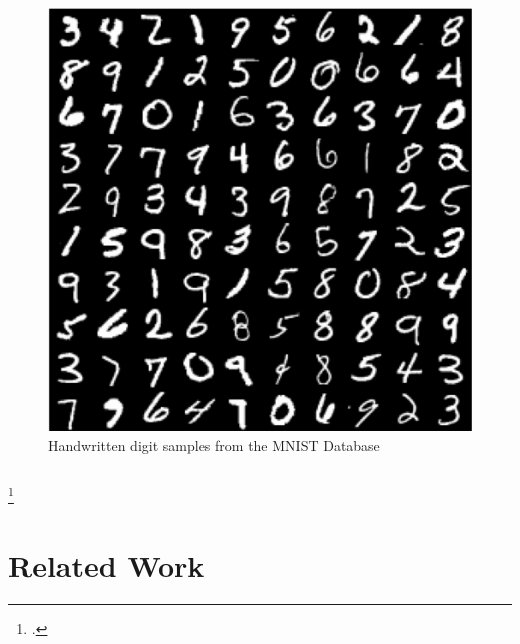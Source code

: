 \documentclass[aspectratio=169,usenames,dvipsnames]{beamer}
\begin{document}
\begin{frame}
\begin{columns}[c]
\begin{column}{.5\linewidth}
\begin{figure}
\centering
\includegraphics[width=0.7\linewidth]{mnist_digit_ex.png}
\caption{Handwritten digit samples from the MNIST Database \footnotemark}
\label{fig:mnist_digit_ex}
\end{figure}

\end{column}

\end{columns}
\vspace{0.5em}

\footcitetext{lecun-mnist}

\end{frame}








\section{Related Work}
\end{document}
